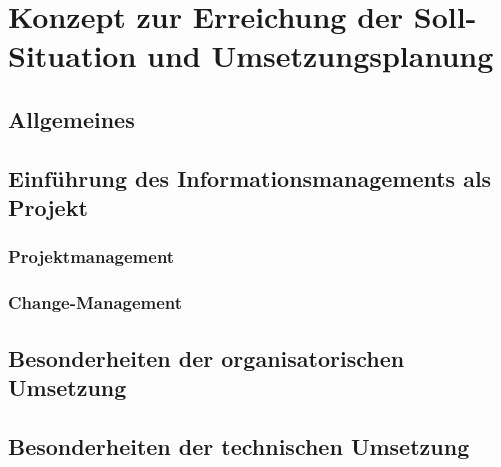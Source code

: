 \chapter{Konzept zur Erreichung der Soll-Situation und Umsetzungsplanung}

\section{Allgemeines}

\section{Einführung des Informationsmanagements als Projekt}
\subsection{Projektmanagement}
\subsection{Change-Management}

\section{Besonderheiten der organisatorischen Umsetzung}

\section{Besonderheiten der technischen Umsetzung}